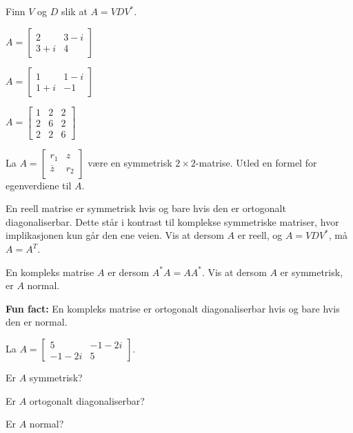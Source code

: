\begin{oppgave}
Finn $V$ og $D$ slik at $A=VDV^*$.
\begin{punkt}
$
A=\begin{bmatrix}
2 & 3-i\\
3+i & 4
\end{bmatrix}
$
\end{punkt}
\begin{punkt}
$
A=\begin{bmatrix}
1 & 1-i\\
1+i & -1
\end{bmatrix}
$
\end{punkt}
\begin{punkt}
$
A=
\begin{bmatrix}
1 & 2 & 2\\
2 & 6 & 2\\
2 & 2 & 6
\end{bmatrix}
$ 
\end{punkt}
\end{oppgave}

\begin{oppgave}
La $A=\begin{bmatrix}
r_1 & z\\
\overline{z} & r_2
\end{bmatrix}$ være en symmetrisk $2 \times 2$-matrise. Utled en formel for egenverdiene til $A$.
\end{oppgave}



\begin{oppgave}
En reell matrise er symmetrisk hvis og bare hvis den er ortogonalt diagonaliserbar. 
Dette står i kontrast til komplekse symmetriske matriser, hvor implikasjonen kun går den ene veien. 
Vis at dersom $A$ er reell, og $A=VDV^*$, må $A=A^T$.
\end{oppgave}

\begin{oppgave}
En kompleks matrise $A$ er  dersom $A^*A=AA^*$. 
Vis at dersom $A$ er symmetrisk, er $A$ normal. 

\textbf{Fun fact:} En kompleks matrise er ortogonalt diagonaliserbar hvis og bare hvis den er normal.
\end{oppgave}

\begin{oppgave}
La 
$
A=
\begin{bmatrix}
5 &-1-2i \\-1-2i & 5
\end{bmatrix}.
$
\begin{punkt}
Er $A$ symmetrisk?
\end{punkt}
\begin{punkt}
Er $A$ ortogonalt diagonaliserbar? 
\end{punkt}
\begin{punkt}
Er $A$ normal?
\end{punkt}
\end{oppgave}


